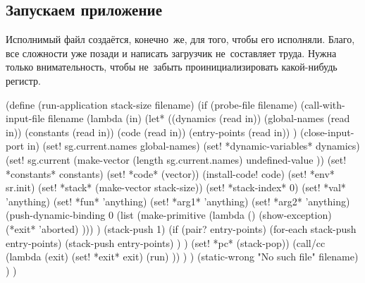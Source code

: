 \subsection{Запускаем приложение}\label{compilation/separate/ssect:execute}

Исполнимый файл создаётся, конечно~же, для того, чтобы его исполняли. Благо,
все сложности уже позади и написать загрузчик не~составляет труда. Нужна только
внимательность, чтобы не~забыть проинициализировать какой-нибудь регистр.

\begin{code:lisp}
(define (run-application stack-size filename)
  (if (probe-file filename)
      (call-with-input-file filename
        (lambda (in)
          (let* ((dynamics     (read in))
                 (global-names (read in))
                 (constants    (read in))
                 (code         (read in))
                 (entry-points (read in)) )
            (close-input-port in)
            (set! sg.current.names    global-names)
            (set! *dynamic-variables* dynamics)
            (set! sg.current (make-vector (length sg.current.names)
                                          undefined-value ))
            (set! *constants*         constants)
            (set! *code*              (vector))
            (install-code! code)
            (set! *env*               sr.init)
            (set! *stack*             (make-vector stack-size))
            (set! *stack-index*       0)
            (set! *val*               'anything)
            (set! *fun*               'anything)
            (set! *arg1*              'anything)
            (set! *arg2*              'anything)
            (push-dynamic-binding
             0 (list (make-primitive (lambda ()
                                       (show-exception)
                                       (*exit* 'aborted) ))) )
            (stack-push 1)
            (if (pair? entry-points)
                (for-each stack-push entry-points)
                (stack-push entry-points) ) )
          (set! *pc* (stack-pop))
          (call/cc (lambda (exit)
                     (set! *exit* exit)
                     (run) )) ) )
      (static-wrong "No such file" filename) ) )
\end{code:lisp}

